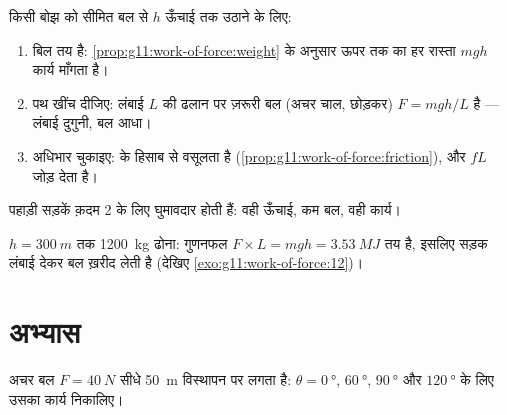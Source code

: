 \begin{method}[कम बल से चढ़ना: घुमावदार रास्ता]\label{met:g11:work-of-force:zigzag}
किसी बोझ को सीमित बल से $h$ ऊँचाई तक उठाने के लिए:
\begin{enumerate}
  \item बिल तय है: \cref{prop:g11:work-of-force:weight} के अनुसार ऊपर तक का हर रास्ता $mgh$
        कार्य माँगता है।
  \item पथ खींच दीजिए: लंबाई $L$ की ढलान पर ज़रूरी बल (अचर चाल,
         छोड़कर) $F = mgh/L$ है --- लंबाई दुगुनी, बल
        आधा।
  \item अधिभार चुकाइए:   के हिसाब से वसूलता है
        (\cref{prop:g11:work-of-force:friction}), और $fL$ जोड़ देता है।
\end{enumerate}
पहाड़ी सड़कें क़दम 2 के लिए घुमावदार होती हैं: वही ऊँचाई, कम बल,
वही कार्य।
\end{method}

\begin{omfigure}

{\small $h = \qty{300}{m}$ तक \qty{1200}{kg} ढोना: गुणनफल $F \times L = mgh = \qty{3.53}{MJ}$ तय है, इसलिए सड़क लंबाई देकर
बल ख़रीद लेती है (देखिए \cref{exo:g11:work-of-force:12})।}
\end{omfigure}

\section{अभ्यास}

\begin{exercise}[$\star$]\label{exo:g11:work-of-force:1}
अचर बल $F = \qty{40}{N}$ सीधे \qty{50}{m} विस्थापन पर लगता है: $\theta = \qty{0}{\degree}$, $\qty{60}{\degree}$,
$\qty{90}{\degree}$ और $\qty{120}{\degree}$ के लिए उसका कार्य निकालिए।
\end{exercise}

